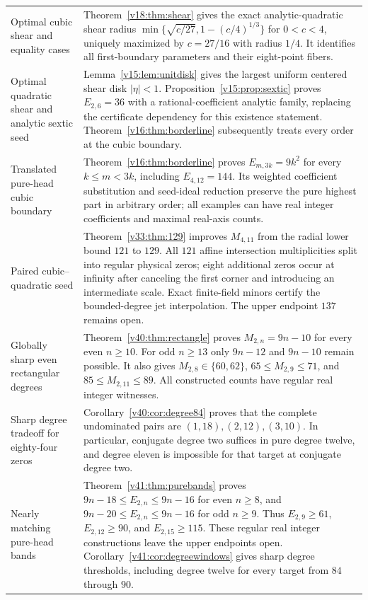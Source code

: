 \documentclass[UTF8,11pt]{ctexart}
\theoremstyle{definition}
\numberwithin{equation}{section}
\begin{document}
\begin{longtable}{@{}>{\raggedright\arraybackslash}p{}>{\raggedright\arraybackslash}p{}@{}}
Optimal cubic shear and equality cases & Theorem~\ref{v18:thm:shear} gives the exact analytic-quadratic shear radius $\min\{\sqrt{c/27},1-(c/4)^{1/3}\}$ for $0<c<4$, uniquely maximized by $c=27/16$ with radius $1/4$. It identifies all first-boundary parameters and their eight-point fibers. \\
Optimal quadratic shear and analytic sextic seed & Lemma~\ref{v15:lem:unitdisk} gives the largest uniform centered shear disk $|\eta|<1$. Proposition~\ref{v15:prop:sextic} proves $E_{2,6}=36$ with a rational-coefficient analytic family, replacing the certificate dependency for this existence statement. Theorem~\ref{v16:thm:borderline} subsequently treats every order at the cubic boundary. \\
Translated pure-head cubic boundary & Theorem~\ref{v16:thm:borderline} proves $E_{m,3k}=9k^2$ for every $k\le m<3k$, including $E_{4,12}=144$. Its weighted coefficient substitution and seed-ideal reduction preserve the pure highest part in arbitrary order; all examples can have real integer coefficients and maximal real-axis counts. \\
Paired cubic--quadratic seed & Theorem~\ref{v33:thm:129} improves $M_{4,11}$ from the radial lower bound $121$ to $129$. All $121$ affine intersection multiplicities split into regular physical zeros; eight additional zeros occur at infinity after canceling the first corner and introducing an intermediate scale. Exact finite-field minors certify the bounded-degree jet interpolation. The upper endpoint $137$ remains open. \\
Globally sharp even rectangular degrees & Theorem~\ref{v40:thm:rectangle} proves $M_{2,n}=9n-10$ for every even $n\ge10$. For odd $n\ge13$ only $9n-12$ and $9n-10$ remain possible. It also gives $M_{2,8}\in\{60,62\}$, $65\le M_{2,9}\le71$, and $85\le M_{2,11}\le89$. All constructed counts have regular real integer witnesses. \\
Sharp degree tradeoff for eighty-four zeros & Corollary~\ref{v40:cor:degree84} proves that the complete undominated pairs are $(1,18),(2,12),(3,10)$. In particular, conjugate degree two suffices in pure degree twelve, and degree eleven is impossible for that target at conjugate degree two. \\
Nearly matching pure-head bands & Theorem~\ref{v41:thm:purebands} proves $9n-18\le E_{2,n}\le9n-16$ for even $n\ge8$, and $9n-20\le E_{2,n}\le9n-16$ for odd $n\ge9$. Thus $E_{2,9}\ge61$, $E_{2,12}\ge90$, and $E_{2,15}\ge115$. These regular real integer constructions leave the upper endpoints open. Corollary~\ref{v41:cor:degreewindows} gives sharp degree thresholds, including degree twelve for every target from $84$ through $90$. \\

\end{longtable}
\end{document}
